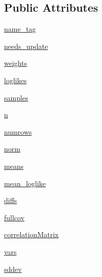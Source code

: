 \subsection*{Public Attributes}
\begin{DoxyCompactItemize}
\item 
\mbox{\hyperlink{classgetdist_1_1chains_1_1WeightedSamples_ad33b233c472608ada6a0fe5d8e241aac}{name\+\_\+tag}}
\item 
\mbox{\hyperlink{classgetdist_1_1chains_1_1WeightedSamples_a3383319042d4db9ec921b19542b1fb9c}{needs\+\_\+update}}
\item 
\mbox{\hyperlink{classgetdist_1_1chains_1_1WeightedSamples_a9465be88e1aedfe56830e8c730950d59}{weights}}
\item 
\mbox{\hyperlink{classgetdist_1_1chains_1_1WeightedSamples_afb971bef6eb53cba9bdc95aa2a2f4255}{loglikes}}
\item 
\mbox{\hyperlink{classgetdist_1_1chains_1_1WeightedSamples_a4294526e2f75dc40e0cc1f3afd1c09ff}{samples}}
\item 
\mbox{\hyperlink{classgetdist_1_1chains_1_1WeightedSamples_a4343f22364965b552f30d4c63396ffdb}{n}}
\item 
\mbox{\hyperlink{classgetdist_1_1chains_1_1WeightedSamples_ab019d2809b81f29766c1cb53585212c9}{numrows}}
\item 
\mbox{\hyperlink{classgetdist_1_1chains_1_1WeightedSamples_a9668d5ddcf224bd3b53e83f0fae564e6}{norm}}
\item 
\mbox{\hyperlink{classgetdist_1_1chains_1_1WeightedSamples_ab1a8c8e1397e28d9b340fbd573d95831}{means}}
\item 
\mbox{\hyperlink{classgetdist_1_1chains_1_1WeightedSamples_aea57e7e62ea049618eb74ccbcb7ed4d0}{mean\+\_\+loglike}}
\item 
\mbox{\hyperlink{classgetdist_1_1chains_1_1WeightedSamples_a382c486d37abc70b84536caf7974fc3a}{diffs}}
\item 
\mbox{\hyperlink{classgetdist_1_1chains_1_1WeightedSamples_a9264a247af02845d9f5e0e56440f4571}{fullcov}}
\item 
\mbox{\hyperlink{classgetdist_1_1chains_1_1WeightedSamples_afa743b2a9422d70b91370c7b27c2e163}{correlation\+Matrix}}
\item 
\mbox{\hyperlink{classgetdist_1_1chains_1_1WeightedSamples_aca7412c4641ed7e7b8caed6bc6e5fea8}{vars}}
\item 
\mbox{\hyperlink{classgetdist_1_1chains_1_1WeightedSamples_a739f1abc86f6ff5f37eb2f0fe919050d}{sddev}}
\end{DoxyCompactItemize}
